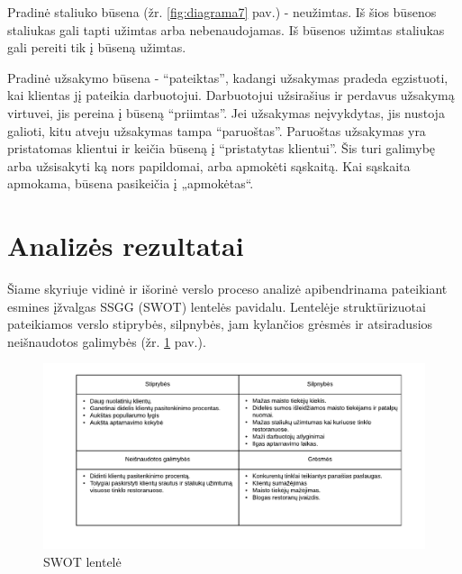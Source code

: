 \documentclass{VUMIFPSkursinis}
\begin{document}
Pradinė  staliuko  būsena (žr. \ref{fig:diagrama7} pav.)  - neužimtas.  Iš  šios  būsenos  staliukas  gali  tapti  užimtas  arba nebenaudojamas. Iš būsenos užimtas staliukas gali pereiti tik į būseną užimtas. 



Pradinė užsakymo būsena - “pateiktas”, kadangi užsakymas pradeda egzistuoti, kai klientas jį pateikia darbuotojui. Darbuotojui užsirašius ir perdavus užsakymą virtuvei, jis pereina į būseną “priimtas”. Jei užsakymas neįvykdytas, jis nustoja galioti, kitu atveju užsakymas  tampa “paruoštas”. Paruoštas užsakymas yra pristatomas klientui ir keičia būseną į “pristatytas klientui”. Šis turi galimybę arba užsisakyti ką nors papildomai, arba apmokėti sąskaitą. Kai sąskaita apmokama, būsena pasikeičia į „apmokėtas“.\\
\section{Analizės rezultatai}

Šiame skyriuje vidinė ir išorinė verslo proceso analizė apibendrinama pateikiant esmines įžvalgas SSGG (SWOT) lentelės pavidalu. Lentelėje struktūrizuotai pateikiamos verslo stiprybės, silpnybės, jam kylančios grėsmės ir atsiradusios neišnaudotos galimybės (žr. \ref{fig:diagrama9} pav.).

	\begin {figure}[H]
	\centering
		\caption{SWOT lentelė}
		\includegraphics[scale=1]{img/3lab/Diagrama9}
		
		\label{fig:diagrama9}
	\end{figure}
\end{document}
